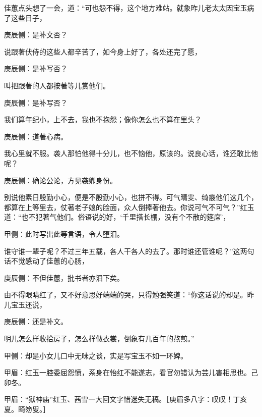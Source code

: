 \begin{parag}
    佳蕙点头想了一会，道：“可也怨不得，这个地方难站。就象昨儿老太太因宝玉病了这些日子，\begin{note}庚辰侧：是补文否？\end{note}说跟著伏侍的这些人都辛苦了，如今身上好了，各处还完了愿，\begin{note}庚辰侧：是补写否？\end{note}叫把跟著的人都按著等儿赏他们。\begin{note}庚辰侧：是补写否？\end{note}我们算年纪小，上不去，我也不抱怨；像你怎么也不算在里头？\begin{note}庚辰侧：道著心病。\end{note}我心里就不服。袭人那怕他得十分儿，也不恼他，原该的。说良心话，谁还敢比他呢？\begin{note}庚辰侧：确论公论，方见袭卿身份。\end{note}别说他素日殷勤小心，便是不殷勤小心，也拼不得。可气晴雯、绮霰他们这几个，都算在上等里去，仗著老子娘的脸面，众人倒捧著他去。你说可气不可气？”红玉道：“也不犯著气他们。俗语说的好，‘千里搭长棚，没有个不散的筵席’，\begin{note}甲侧：此时写出此等言语，令人堕泪。\end{note}谁守谁一辈子呢？不过三年五载，各人干各人的去了。那时谁还管谁呢？”这两句话不觉感动了佳蕙的心肠，\begin{note}庚辰侧：不但佳蕙，批书者亦泪下矣。\end{note}由不得眼睛红了，又不好意思好端端的哭，只得勉强笑道：“你这话说的却是。昨儿宝玉还说，\begin{note}庚辰侧：还是补文。\end{note}明儿怎么样收拾房子，怎么样做衣裳，倒象有几百年的熬煎。”\begin{note}甲侧：却是小女儿口中无味之谈，实是写宝玉不如一环婢。\end{note}\begin{note}甲眉：红玉一腔委屈怨愤，系身在怡红不能遂志，看官勿错认为芸儿害相思也。己卯冬。\end{note}\begin{note}甲眉：“狱神庙”红玉、茜雪一大回文字惜迷失无稿。［庚眉多八字：叹叹！丁亥夏。畸笏叟。］\end{note}
\end{parag}


